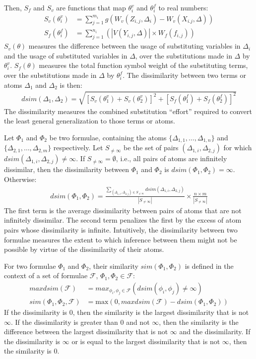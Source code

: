 \documentclass[EPiC]{easychair}
\begin{document}
Then, $S_f$ and $S_v$ are functions that map $\theta_i^v$ and 
$\theta_i^f$ to real numbers:
\begin{align}
S_v(\theta_i^v) &= \sum_{j=1}^{m_i} g(W_v(Z_{i,j},\Delta_i) - W_v(X_{i.j},\Delta)) \\
S_f(\theta_i^f) &= \sum_{j=1}^{n_i} (|V(Y_{i,j},\Delta)| \times W_f(f_{i,j}))
\end{align}
$S_v(\theta)$ measures the difference between the usage of substituting 
variables in $\Delta_i$ and the usage of substituted variables 
in $\Delta$, over the substitutions made in $\Delta$ by $\theta_i^v$.
$S_f(\theta)$ measures the total function symbol weight of the substituting 
terms, over the substitutions made in $\Delta$ by $\theta_i^f$.
The dissimilarity between two terms or atoms $\Delta_1$ and $\Delta_2$ is then:
\begin{align}
dsim(\Delta_1,\Delta_2) = \sqrt{[S_v(\theta_1^v)+S_v(\theta_2^v)]^2+[S_f(\theta_1^f)+S_f(\theta_2^f)]^2}
\end{align}
The dissimilarity measures the combined substitution ``effort'' required to 
convert the least general generalization to those terms or atoms.

Let $\Phi_1$ and $\Phi_2$ be two formulae, containing the atoms
$\{\Delta_{1,1},\dots,\Delta_{1,n}\}$ and 
$\{\Delta_{2,1},\dots,\Delta_{2,m}\}$ respectively.
Let $S_{\neq\infty}$ be the set of pairs $(\Delta_{1,i},\Delta_{2,j})$ 
for which $dsim(\Delta_{1,i},\Delta_{2,j}) \neq \infty$.
If $S_{\neq\infty} = \emptyset$, i.e., all pairs of atoms are infinitely 
dissimilar, then the dissimilarity between $\Phi_1$ and $\Phi_2$ is 
$dsim(\Phi_1,\Phi_2) = \infty$.
Otherwise:
\begin{align}
dsim(\Phi_1,\Phi_2) = 
\frac{\sum_{(\Delta_{1,i},\Delta_{2,j}) \in S_{\neq\infty}}dsim(\Delta_{1,i},\Delta_{2,j})}
{|S_{\neq\infty}|}
\times
\frac{n \times m}{|S_{\neq\infty}|} 
\end{align}
The first term is the average dissimilarity between pairs of atoms that are 
not infinitely dissimilar.
The second term penalizes the first by the excess of atom pairs whose
dissimilarity is infinite.
Intuitively, the dissimilarity between two formulae measures the extent 
to which inference between them might not be possible by virtue of the 
dissimilarity of their atoms.

For two formulae $\Phi_1$ and $\Phi_2$, their similarity $sim(\Phi_1,\Phi_2)$
is defined in the context of a set of formulae $\mathcal{F}$, 
$\Phi_1,\Phi_2 \in \mathcal{F}$:
\begin{align}
maxdsim(\mathcal{F}) &= max_{\phi_i,\phi_j \in \mathcal{F}} (dsim(\phi_i,\phi_j) \neq \infty) \\
sim(\Phi_1,\Phi_2,\mathcal{F}) &= \textrm{max}(0, maxdsim(\mathcal{F}) - dsim(\Phi_1,\Phi_2))
\end{align}
If the dissimilarity is $0$, then the similarity is the largest dissimilarity 
that is not $\infty$.
If the dissimilarity is greater than $0$ and not $\infty$, then the similarity 
is the difference between the largest dissimilarity that is not $\infty$ and 
the dissimilarity.
If the dissimilarity is $\infty$ or is equal to the largest 
dissimilarity that is not $\infty$, then the similarity is $0$.
\end{document}

